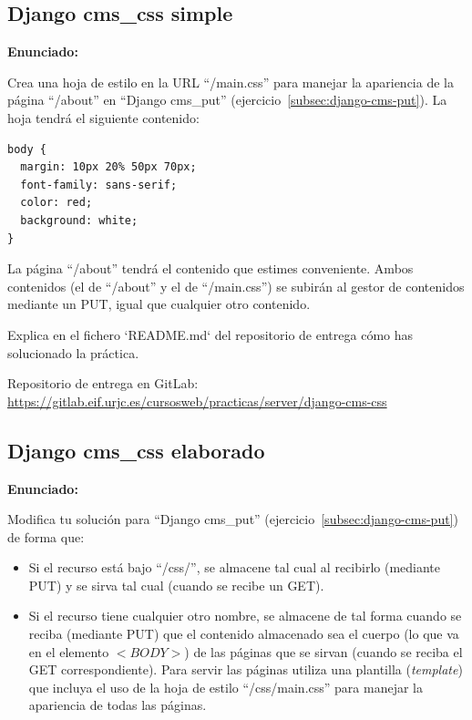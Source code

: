 \subsection{Django cms\_css simple}
\label{subsec:django-cms-css}

\textbf{Enunciado:}

Crea una hoja de estilo en la URL ``/main.css'' para manejar la apariencia de la página ``/about'' en ``Django cms\_put'' (ejercicio~\ref{subsec:django-cms-put}). La hoja tendrá el siguiente contenido:

\begin{verbatim}
body {
  margin: 10px 20% 50px 70px;
  font-family: sans-serif;
  color: red;
  background: white;
}
\end{verbatim}

La página ``/about'' tendrá el contenido que estimes conveniente. Ambos contenidos (el de ``/about'' y el de ``/main.css'') se subirán al gestor de contenidos mediante un PUT, igual que cualquier otro contenido.

Explica en el fichero `README.md` del repositorio de entrega cómo has solucionado la práctica.

Repositorio de entrega en GitLab: \\
\url{https://gitlab.eif.urjc.es/cursosweb/practicas/server/django-cms-css}

\subsection{Django cms\_css elaborado}
\label{subsec:django-cms-css-2}

\textbf{Enunciado:}

Modifica tu solución para ``Django cms\_put'' (ejercicio~\ref{subsec:django-cms-put}) de forma que:

\begin{itemize}
\item Si el recurso está bajo ``/css/'', se almacene tal cual al recibirlo (mediante PUT) y se sirva tal cual (cuando se recibe un GET).
\item Si el recurso tiene cualquier otro nombre, se almacene de tal forma cuando se reciba (mediante PUT) que el contenido almacenado sea el cuerpo (lo que va en el elemento $<BODY>$) de las páginas que se sirvan (cuando se reciba el GET correspondiente). Para servir las páginas utiliza una plantilla (\emph{template}) que incluya el uso de la hoja de estilo ``/css/main.css'' para manejar la apariencia de todas las páginas.
\end{itemize}


